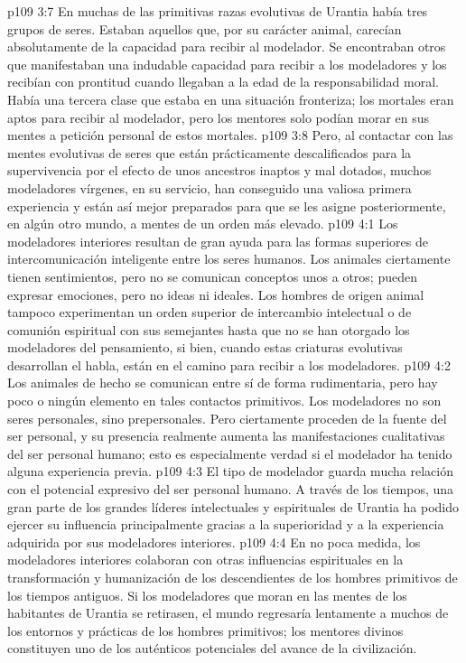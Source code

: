 \vs p109 3:7 \pc En muchas de las primitivas razas evolutivas de Urantia había tres grupos de seres. Estaban aquellos que, por su carácter animal, carecían absolutamente de la capacidad para recibir al modelador. Se encontraban otros que manifestaban una indudable capacidad para recibir a los modeladores y los recibían con prontitud cuando llegaban a la edad de la responsabilidad moral. Había una tercera clase que estaba en una situación fronteriza; los mortales eran aptos para recibir al modelador, pero los mentores solo podían morar en sus mentes a petición personal de estos mortales.
\vs p109 3:8 Pero, al contactar con las mentes evolutivas de seres que están prácticamente descalificados para la supervivencia por el efecto de unos ancestros inaptos y mal dotados, muchos modeladores vírgenes, en su servicio, han conseguido una valiosa primera experiencia y están así mejor preparados para que se les asigne posteriormente, en algún otro mundo, a mentes de un orden más elevado.
\vs p109 4:1 Los modeladores interiores resultan de gran ayuda para las formas superiores de intercomunicación inteligente entre los seres humanos. Los animales ciertamente tienen sentimientos, pero no se comunican conceptos unos a otros; pueden expresar emociones, pero no ideas ni ideales. Los hombres de origen animal tampoco experimentan un orden superior de intercambio intelectual o de comunión espiritual con sus semejantes hasta que no se han otorgado los modeladores del pensamiento, si bien, cuando estas criaturas evolutivas desarrollan el habla, están en el camino para recibir a los modeladores.
\vs p109 4:2 Los animales de hecho se comunican entre sí de forma rudimentaria, pero hay poco o ningún elemento  en tales contactos primitivos. Los modeladores no son seres personales, sino prepersonales. Pero ciertamente proceden de la fuente del ser personal, y su presencia realmente aumenta las manifestaciones cualitativas del ser personal humano; esto es especialmente verdad si el modelador ha tenido alguna experiencia previa.
\vs p109 4:3 El tipo de modelador guarda mucha relación con el potencial expresivo del ser personal humano. A través de los tiempos, una gran parte de los grandes líderes intelectuales y espirituales de Urantia ha podido ejercer su influencia principalmente gracias a la superioridad y a la experiencia adquirida por sus modeladores interiores.
\vs p109 4:4 En no poca medida, los modeladores interiores colaboran con otras influencias espirituales en la transformación y humanización de los descendientes de los hombres primitivos de los tiempos antiguos. Si los modeladores que moran en las mentes de los habitantes de Urantia se retirasen, el mundo regresaría lentamente a muchos de los entornos y prácticas de los hombres primitivos; los mentores divinos constituyen uno de los auténticos potenciales del avance de la civilización.
